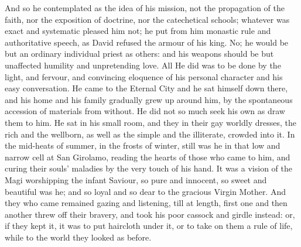 And so he contemplated as the idea of his mission, not the
propagation of the faith, nor the exposition of doctrine, nor
the catechetical schools; whatever was exact and systematic pleased
him not; he put from him monastic rule and authoritative speech, as
David refused the armour of his king. No; he would be but an ordinary
individual priest as others: and his weapons should be but unaffected
humility and unpretending love. All He did was to be done by the
light, and fervour, and convincing eloquence of his personal character
and his easy conversation. He came to the Eternal City and he sat
himself down there, and his home and his family gradually grew up
around him, by the spontaneous accession of materials from without. He
did not so much seek his own as draw them to him. He sat in his small
room, and they in their gay worldly dresses, the rich and the
wellborn, as well as the simple and the illiterate, crowded into it.
In the mid-heats of summer, in the frosts of winter, still was he in
that low and narrow cell at San Girolamo, reading the hearts of those
who came to him, and curing their souls' maladies by the very touch of
his hand. It was a vision of the Magi worshipping the infant Saviour,
so pure and innocent, so sweet and beautiful was he; and so loyal and
so dear to the gracious Virgin Mother. And they who came remained
gazing and listening, till at length, first one and then another threw
off their bravery, and took his poor cassock and girdle instead: or,
if they kept it, it was to put haircloth under it, or to take on them
a rule of life, while to the world they looked as before.

